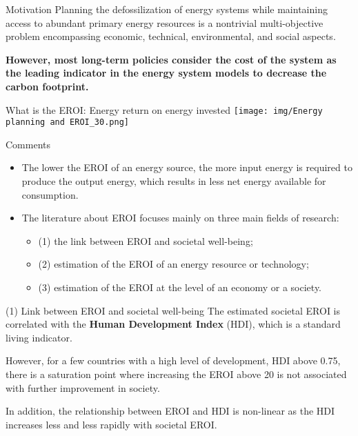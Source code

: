 \begin{frame}{Motivation}
\label{motivation}
Planning the defossilization of energy systems while maintaining access
to abundant primary energy resources is a nontrivial multi-objective
problem encompassing economic, technical, environmental, and social
aspects.

\textbf{However, most long-term policies consider the cost of the system
as the leading indicator in the energy system models to decrease the
carbon footprint.}
\end{frame}

\begin{frame}{What is the EROI: Energy return on energy invested}
\label{what-is-the-eroi-energy-return-on-energy-invested}
\texttt{[image: img/Energy planning and EROI\_30.png]}
\end{frame}

\begin{frame}{Comments}
\label{comments}
\begin{itemize}
\tightlist
\item
  The lower the EROI of an energy source, the more input energy is
  required to produce the output energy, which results in less net
  energy available for consumption.
\item
  The literature about EROI focuses mainly on three main fields of
  research:

  \begin{itemize}
  \tightlist
  \item
    (1) the link between EROI and societal well-being;
  \item
    (2) estimation of the EROI of an energy resource or technology;
  \item
    (3) estimation of the EROI at the level of an economy or a society.
  \end{itemize}
\end{itemize}
\end{frame}

\begin{frame}{(1) Link between EROI and societal well-being}
\label{link-between-eroi-and-societal-well-being}
The estimated societal EROI is correlated with the \textbf{Human
Development Index} (HDI), which is a standard living indicator.

However, for a few countries with a high level of development, HDI above
0.75, there is a saturation point where increasing the EROI above 20 is
not associated with further improvement in society.

In addition, the relationship between EROI and HDI is non-linear as the
HDI increases less and less rapidly with societal EROI.
\end{frame}

